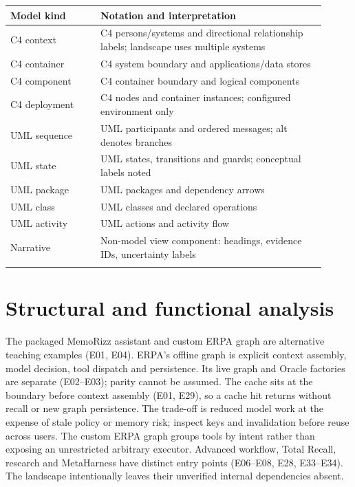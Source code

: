 \documentclass[10pt,letterpaper]{article}
\begin{document}
\begin{longtable}{@{}>{\raggedright\arraybackslash}p{0.26\linewidth}>{\raggedright\arraybackslash}p{0.65\linewidth}@{}}
\toprule
Model kind & Notation and interpretation\\\midrule\endhead
C4 context & C4 persons/systems and directional relationship labels; landscape uses multiple systems\\\addlinespace
C4 container & C4 system boundary and applications/data stores\\\addlinespace
C4 component & C4 container boundary and logical components\\\addlinespace
C4 deployment & C4 nodes and container instances; configured environment only\\\addlinespace
UML sequence & UML participants and ordered messages; alt denotes branches\\\addlinespace
UML state & UML states, transitions and guards; conceptual labels noted\\\addlinespace
UML package & UML packages and dependency arrows\\\addlinespace
UML class & UML classes and declared operations\\\addlinespace
UML activity & UML actions and activity flow\\\addlinespace
Narrative & Non-model view component: headings, evidence IDs, uncertainty labels\\\addlinespace
\bottomrule\end{longtable}
\section{Structural and functional analysis}
The packaged MemoRizz assistant and custom ERPA graph are alternative teaching examples (E01, E04). ERPA's offline graph is explicit context assembly, model decision, tool dispatch and persistence. Its live graph and Oracle factories are separate (E02--E03); parity cannot be assumed. The cache sits at the boundary before context assembly (E01, E29), so a cache hit returns without recall or new graph persistence. The trade-off is reduced model work at the expense of stale policy or memory risk; inspect keys and invalidation before reuse across users. The custom ERPA graph groups tools by intent rather than exposing an unrestricted arbitrary executor. Advanced workflow, Total Recall, research and MetaHarness have distinct entry points (E06--E08, E28, E33--E34). The landscape intentionally leaves their unverified internal dependencies absent.
\end{document}
